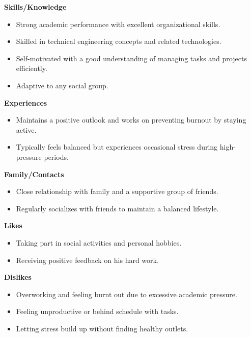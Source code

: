 \begin{center} \textbf{Skills/Knowledge} \end{center}
\begin{itemize}
    \item Strong academic performance with excellent organizational skills.
    \item Skilled in technical engineering concepts and related technologies.
    \item Self-motivated with a good understanding of managing tasks and projects efficiently.
    \item Adaptive to any social group.
\end{itemize}

\begin{center} \textbf{Experiences} \end{center}
\begin{itemize}
    \item Maintains a positive outlook and works on preventing burnout by staying active.
    \item Typically feels balanced but experiences occasional stress during high-pressure periods.
\end{itemize}

\begin{center} \textbf{Family/Contacts} \end{center}
\begin{itemize}
    \item Close relationship with family and a supportive group of friends.
    \item Regularly socializes with friends to maintain a balanced lifestyle.
\end{itemize}

\begin{center} \textbf{Likes} \end{center}
\begin{itemize}
    \item Taking part in social activities and personal hobbies.
    \item Receiving positive feedback on his hard work.
\end{itemize}

\begin{center} \textbf{Dislikes} \end{center}
\begin{itemize}
    \item Overworking and feeling burnt out due to excessive academic pressure.
    \item Feeling unproductive or behind schedule with tasks.
    \item Letting stress build up without finding healthy outlets.
\end{itemize}

